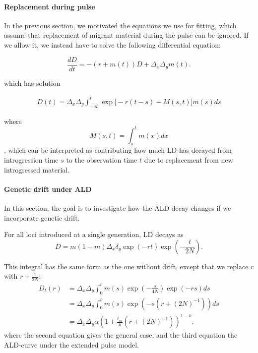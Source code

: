 \documentclass[11pt]{article}
\let\oldparagraph\paragraph
\renewcommand{\paragraph}[1]{\oldparagraph{#1}\mbox{}}
\begin{document}
\paragraph{Replacement during pulse}
In the previous section, we motivated the equations we use for fitting, which assume that replacement of migrant material during the pulse can be ignored. If we allow it, we instead 
have to solve the following differential equation:

\begin{equation}
    \frac{dD}{dt} = -(r + m(t)) D + \Delta_x\Delta_y m(t)\text{.}
\end{equation}

which has solution

\begin{align}
    D(t) = \Delta_x\Delta_y\int_{-\infty}^t \exp\big[-r(t -s) - M(s,t)\big] m(s) ds
\end{align}

where $$M(s,t) = \int_s^t m(x)dx$$, 
which can be interpreted as contributing how much LD has decayed from introgression time $s$ to the observation time $t$ due to replacement from new introgressed material.


\paragraph{Genetic drift under ALD}
In this section, the goal is to investigate how the ALD decay changes if we incorporate genetic drift.

For all loci introduced at a single generation, LD decays as \cite{loh_inferring_2013}
$$D = m(1-m)\Delta_x\delta_y\exp(-rt)\exp(-\frac{t}{2N}).$$

This integral has the same form as the one without drift, except that we replace $r$ with $r + \frac{1}{2N}$:
\begin{align}
    D_t(r) &= \Delta_x\Delta_y\int_0^t m(s)\exp\left(-\frac{s}{4N}\right)\exp(-rs) ds \nonumber\\
        &= \Delta_x\Delta_y\int_0^t
        m(s)\exp\left(-s(r+(2N)^{-1})\right) ds \label{eq:ld_drift}\\
&= \Delta_x\Delta_y \alpha\left(1 + \frac{t_m}{k} (r+(2N)^{-1})\right) ^{1-k} ,
\end{align}
where the second equation gives the general case, and the third equation the ALD-curve under the extended pulse model. 




\end{document}
